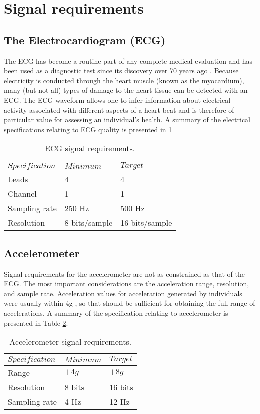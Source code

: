 \section{Signal requirements}\label{signal requirements}
\subsection{The Electrocardiogram (ECG)}
\hspace{10mm}The ECG has become a routine part of any complete medical evaluation and has been used as a diagnostic 
test since its discovery over 70 years ago \cite{ecg}. Because electricity is conducted through 
the heart muscle (known as the myocardium), many (but not all) types of damage 
to the heart tissue can be detected with an ECG. The ECG waveform allows one to 
infer information about electrical activity associated with different aspects of a heart 
beat and is therefore of particular value for assessing an individual's  health. A summary of the electrical specifications relating to ECG quality is presented in \ref{table:ecg}

\begin{table}
  \centering
  \begin{tabular}{|l|l|l|}
    \hline
    $Specification$ & $Minimum$ & $Target$ \\
    \hline
    Leads & 4 & 4 \\
    Channel & 1 & 1 \\
    Sampling rate & 250 Hz & 500 Hz \\
    Resolution & 8 bits/sample & 16 bits/sample \\
    \hline
  \end{tabular}
  \caption{ECG signal requirements.}
  \label{table:ecg}
\end{table}

\subsection{Accelerometer}
\hspace{10mm}Signal requirements for the accelerometer are not as constrained as that of the ECG. The most important considerations are the acceleration range, resolution, and sample rate. Acceleration values for acceleration generated by individuals were usually within 4g \cite{wearable_ecg}, so that should be sufficient for obtaining the full range of accelerations. A summary of the specification relating to accelerometer is presented in Table \ref{table:acc}.
\begin{table}[h]
	\centering
	\begin{tabular}{|l |l|l|}
		\hline
		$Specification$ & $Minimum$ & $Target$ \\
		\hline
		Range & $\pm 4g$ & $\pm 8g$ \\
		Resolution & 8 bits & 16 bits\\
		Sampling rate & 4 Hz & 12 Hz \\
		\hline
	\end{tabular}
	\caption{Accelerometer signal requirements.}
	\label{table:acc}
\end{table}

